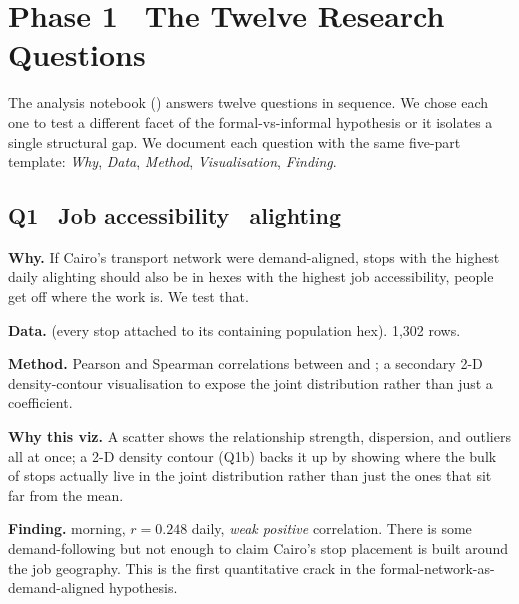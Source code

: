 
\section{Phase 1 \textbullet\ The Twelve Research Questions}
\label{sec:phase1-questions}

The analysis notebook () answers twelve
questions in sequence. We chose each one to test a different
facet of the formal-vs-informal hypothesis or it isolates a single
structural gap. We document each question with the same five-part
template: \emph{Why}, \emph{Data}, \emph{Method}, \emph{Visualisation},
\emph{Finding}.

\subsection{Q1 \textbullet\ Job accessibility \texttimes\ alighting}

\textbf{Why.} If Cairo's transport network were demand-aligned, stops
with the highest daily alighting should also be in hexes with the
highest job accessibility, people get off where the work is. We test
that.

\textbf{Data.}  (every stop
attached to its containing population hex). 1{,}302 rows.

\textbf{Method.} Pearson and Spearman correlations between
 and ; a
secondary 2-D density-contour visualisation to expose the joint
distribution rather than just a coefficient.


\textbf{Why this viz.} A scatter shows the relationship strength,
dispersion, and outliers all at once; a 2-D density contour
(Q1b) backs it up by showing where the bulk of stops actually live in
the joint distribution rather than just the ones that sit far from
the mean.

\textbf{Finding.}  morning, $r = 0.248$ daily, 
\emph{weak positive} correlation. There is some demand-following but
not enough to claim Cairo's stop placement is built around the job
geography. This is the first quantitative crack in the
formal-network-as-demand-aligned hypothesis.

